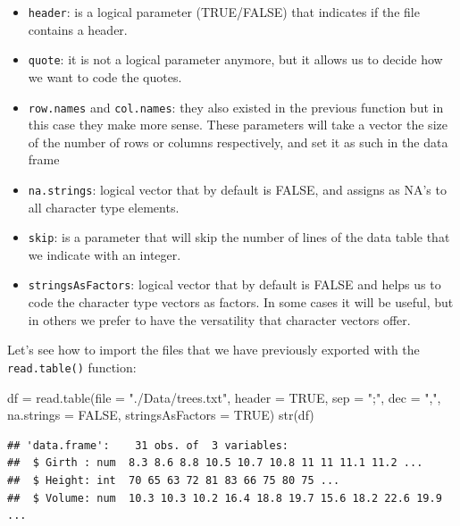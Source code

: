 \documentclass[
]{book}
\newenvironment{Shaded}{\begin{snugshade}}{\end{snugshade}}
\newcommand{\AttributeTok}[1]{\textcolor[rgb]{0.77,0.63,0.00}{#1}}
\newcommand{\ConstantTok}[1]{\textcolor[rgb]{0.00,0.00,0.00}{#1}}
\newcommand{\FunctionTok}[1]{\textcolor[rgb]{0.00,0.00,0.00}{#1}}
\newcommand{\NormalTok}[1]{#1}
\newcommand{\OtherTok}[1]{\textcolor[rgb]{0.56,0.35,0.01}{#1}}
\newcommand{\StringTok}[1]{\textcolor[rgb]{0.31,0.60,0.02}{#1}}
\providecommand{\tightlist}{%
  \setlength{\itemsep}{0pt}\setlength{\parskip}{0pt}}
\begin{document}
\begin{itemize}
\tightlist
\item
  \texttt{header}: is a logical parameter (TRUE/FALSE) that indicates if the file contains a header.
\item
  \texttt{quote}: it is not a logical parameter anymore, but it allows us to decide how we want to code the quotes.
\item
  \texttt{row.names} and \texttt{col.names}: they also existed in the previous function but in this case they make more sense. These parameters will take a vector the size of the number of rows or columns respectively, and set it as such in the data frame
\item
  \texttt{na.strings}: logical vector that by default is FALSE, and assigns as NA's to all character type elements.
\item
  \texttt{skip}: is a parameter that will skip the number of lines of the data table that we indicate with an integer.
\item
  \texttt{stringsAsFactors}: logical vector that by default is FALSE and helps us to code the character type vectors as factors. In some cases it will be useful, but in others we prefer to have the versatility that character vectors offer.
\end{itemize}

Let's see how to import the files that we have previously exported with the \texttt{read.table()} function:

\begin{Shaded}
\begin{Highlighting}[]
\NormalTok{df }\OtherTok{=} \FunctionTok{read.table}\NormalTok{(}\AttributeTok{file =} \StringTok{"./Data/trees.txt"}\NormalTok{, }\AttributeTok{header =} \ConstantTok{TRUE}\NormalTok{, }\AttributeTok{sep =} \StringTok{";"}\NormalTok{, }\AttributeTok{dec =} \StringTok{","}\NormalTok{, }
                \AttributeTok{na.strings =} \ConstantTok{FALSE}\NormalTok{, }\AttributeTok{stringsAsFactors =} \ConstantTok{TRUE}\NormalTok{)}
\FunctionTok{str}\NormalTok{(df)}
\end{Highlighting}
\end{Shaded}

\begin{verbatim}
## 'data.frame':    31 obs. of  3 variables:
##  $ Girth : num  8.3 8.6 8.8 10.5 10.7 10.8 11 11 11.1 11.2 ...
##  $ Height: int  70 65 63 72 81 83 66 75 80 75 ...
##  $ Volume: num  10.3 10.3 10.2 16.4 18.8 19.7 15.6 18.2 22.6 19.9 ...
\end{verbatim}
\end{document}
